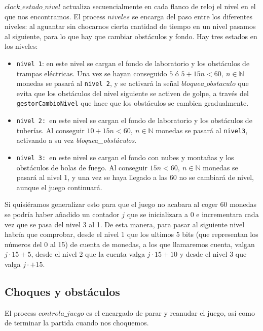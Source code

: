 \documentclass[11pt, a4paper, spanish, openright, twoside]{book}
\begin{document}
$clock\_estado\_nivel$ actualiza secuencialmente en cada flanco de reloj el nivel en el que nos encontramos.
El process $niveles$ se encarga del paso entre los diferentes niveles: al aguantar sin chocarnos cierta cantidad de tiempo en un nivel pasamos al siguiente, para lo que hay que cambiar obstáculos y fondo.
Hay tres estados en los niveles:
\begin{itemize}
\item \texttt{nivel 1}: en este nivel se cargan el fondo de laboratorio y los obstáculos de trampas eléctricas. Una vez se hayan conseguido $5$ ó  $5+15n<60,\ n\in\mathbb{N}$  monedas se pasará al \texttt{nivel 2}, y se activará la señal $bloquea\_obstaculo$ que evita que los obstáculos del nivel siguiente se activen de golpe, a través del \texttt{gestorCambioNivel} que hace que los obstáculos se cambien gradualmente. 
\item \texttt{nivel 2: }en este nivel se cargan el fondo de laboratorio y los obstáculos de tuberías. Al conseguir  $10+15n<60,\ n\in\mathbb{N}$ monedas se pasará al \texttt{nivel3}, activando a su vez \textit{bloquea\_obstáculos}.
\item \texttt{nivel 3: }en este nivel se cargan el fondo con nubes y montañas y los obstáculos de bolas de fuego. Al conseguir $15n<60,\ n\in\mathbb{N}$ monedas se pasará al nivel 1, y una vez se haya llegado a las 60 no se cambiará de nivel, aunque el juego continuará. 
\end{itemize}
Si quisiéramos generalizar esto para que el juego no acabara al coger 60 monedas se podría haber añadido un contador $j$ que se inicializara a 0 e incrementara cada vez que se pasa del nivel 3 al 1. De esta manera, para pasar al siguiente nivel habría que comprobar, desde el nivel 1 que los ultimos 5 bits (que representan los números del 0 al 15) de cuenta de monedas, a los que llamaremos cuenta, valgan $j\cdot 15 + 5$, desde el nivel 2 que la cuenta  valga $j\cdot 15 + 10$ y desde el nivel 3 que valga $j\cdot + 15$. 

\subsection{Choques y obstáculos}

El process $controla\_juego$ es el encargado de parar y reanudar el juego, así como de terminar la partida cuando nos choquemos.
\end{document}

